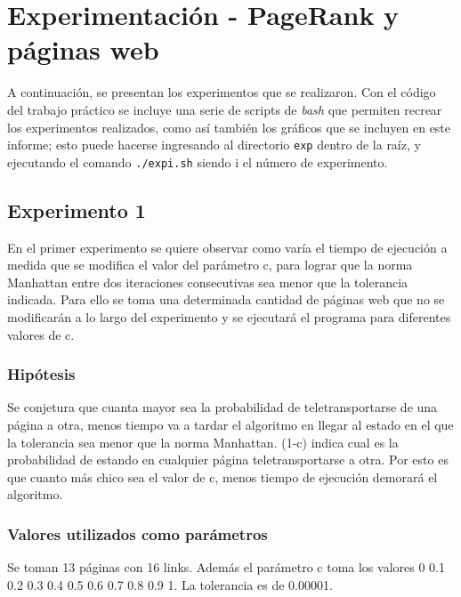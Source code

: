 \section{Experimentación - PageRank y páginas web}
	A continuación, se presentan los experimentos que se realizaron. Con el código del trabajo práctico se incluye una serie de scripts de \emph{bash} que permiten recrear los experimentos realizados, como así también los gráficos que se incluyen en este informe; esto puede hacerse ingresando al directorio \texttt{exp} dentro de la raíz, y ejecutando el comando \texttt{./expi.sh} siendo i el número de experimento.

	\subsection{Experimento 1}
	En el primer experimento se quiere observar como varía el tiempo de ejecución a medida que se modifica el valor del parámetro c, para lograr que la norma Manhattan entre dos iteraciones consecutivas sea menor que la tolerancia indicada. Para ello se toma una determinada cantidad de páginas web que no se modificarán a lo largo del experimento y se ejecutará el programa para diferentes valores de c. 

		\subsubsection*{Hipótesis} 
		Se conjetura que cuanta mayor sea la probabilidad de teletransportarse de una página a otra, menos tiempo va a tardar el algoritmo en llegar al estado en el que la tolerancia sea menor que la norma Manhattan. (1-c) indica cual es la probabilidad de estando en cualquier página teletransportarse a otra. Por esto es que cuanto más chico sea el valor de c, menos tiempo de ejecución demorará el algoritmo.

		\subsubsection*{Valores utilizados como parámetros} 
		Se toman 13 páginas con 16 links. Además el parámetro c toma los valores 0 0.1 0.2 0.3 0.4 0.5 0.6 0.7 0.8 0.9 1. La tolerancia es de 0.00001.

